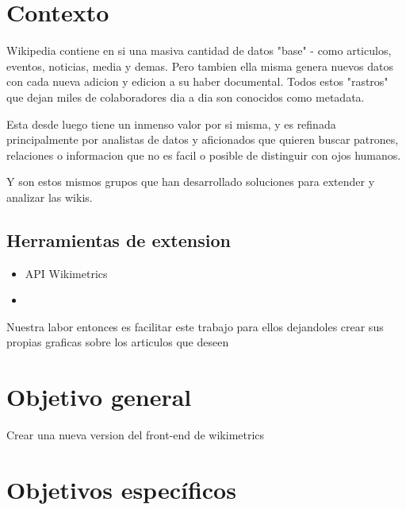 
\section{Contexto}



Wikipedia contiene en si una masiva cantidad de datos "base" - como articulos, eventos, noticias, media y demas. Pero tambien ella misma genera nuevos datos con cada nueva adicion y edicion a su haber documental. Todos estos "rastros" que dejan miles de colaboradores dia a dia son conocidos como metadata.

Esta desde luego tiene un inmenso valor por si misma, y es refinada principalmente por analistas de datos y aficionados que quieren buscar patrones, relaciones o informacion que no es facil o posible de distinguir con ojos humanos.


Y son estos mismos grupos que han desarrollado soluciones para extender y analizar las wikis.


\subsection*{Herramientas de extension }
\begin{itemize}
    \item API Wikimetrics
    \item 
\end{itemize}


Nuestra labor entonces es facilitar este trabajo para ellos dejandoles crear sus propias graficas sobre los articulos que deseen

\section{Objetivo general}
Crear una nueva version del front-end de wikimetrics


\section{Objetivos específicos}

